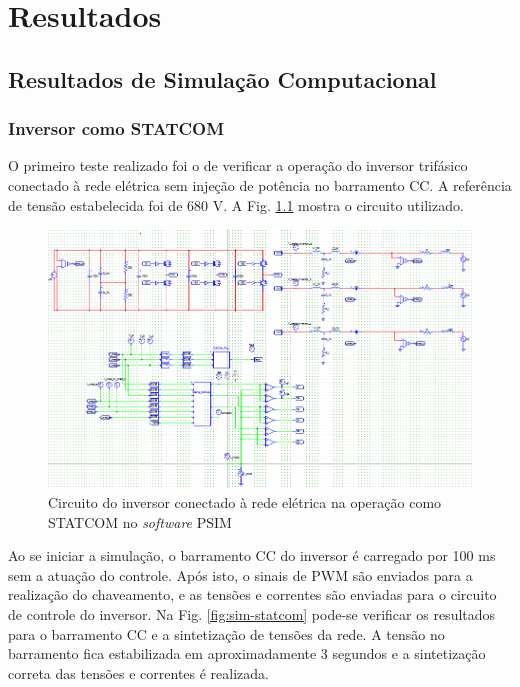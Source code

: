 \chapter{Resultados}

\section{Resultados de Simulação Computacional}

\subsection{Inversor como STATCOM}

O primeiro teste realizado foi o de verificar a operação do inversor trifásico conectado 
à rede elétrica sem injeção de potência no barramento CC. A referência de tensão estabelecida foi de 680 V.
A Fig. \ref{fig:sim-circuito-statcom} mostra o circuito utilizado.

\begin{figure}[!hbt]
	\begin{center}
    \includegraphics[width=\textwidth]{figuras/sim_figures/statcom/circuito.PNG}
    \caption{Circuito do inversor conectado à rede elétrica na operação como STATCOM no \textit{software} PSIM}
    \label{fig:sim-circuito-statcom}
    \end{center}
\end{figure}

Ao se iniciar a simulação, o barramento CC do inversor é carregado por 100 ms sem a atuação do controle. 
Após isto, o sinais de PWM são enviados para a realização do chaveamento, e as tensões e correntes são enviadas para o circuito de controle do inversor.
Na Fig. \ref{fig:sim-statcom} pode-se verificar os resultados para o barramento CC e a sintetização de tensões da rede.
A tensão no barramento fica estabilizada em aproximadamente 3 segundos e a sintetização correta das tensões e correntes é realizada.

